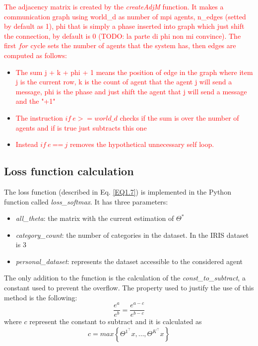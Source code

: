 \documentclass[a4paper,11pt,oneside]{book}
\begin{document}
\textcolor{red}{
The adjacency matrix is created by the \textit{createAdjM} function. It makes a communication graph using world\_d as number of
mpi agents, n\_edges  (setted by default as 1), phi that is simply a phase inserted into
graph which just shift the connection, by default is 0 (TODO: la parte di phi non mi convince). The first $for$
cycle sets the number of agents that the system has, then edges are
computed as follows:}
\begin{itemize}
    \item \textcolor{red}{The sum j + k + phi + 1 means the position of edge in the
    	graph where item j is the current row, k is the count of agent 
    	that the agent j will send a message, phi is the phase and just
    	shift the agent that j will send a message and the "+1" }

    \item \textcolor{red}{The instruction $ if \ e >= world\_d $  checks if the sum is over the number of
    agents and if is true just subtracts this one}

    \item \textcolor{red}{Instead $ if \ e \ $==$ \  j $ removes the hypothetical unnecessary self loop.}
\end{itemize}

\subsection{Loss function calculation}
The loss function (described in Eq. \ref{EQ1.7}) is implemented in the Python function called \textit{loss\_softmax}. It has three parameters:\\
\begin{itemize}
	\item \textit{all\_theta}: the matrix with the current estimation of $\Theta^*$
	\item \textit{category\_count}: the number of categories in the dataset. In the IRIS dataset is $3$
	\item \textit{personal\_dataset}: represents the dataset accessible to the considered agent
\end{itemize}
The only addition to the function is the calculation of the \textit{const\_to\_subtract}, a constant used to prevent the overflow. The property used to justify the use of this method is the following:
\begin{equation}
	\dfrac{e^a}{e^b} = \dfrac{e^{a-c}}{e^{b-c}}
\end{equation}
where $c$ represent the constant to subtract and it is calculated as
\begin{equation}
	c = max \left\{ \Theta^{1^\top}x, \dots,  \Theta^{K^\top}x \right\}
\end{equation}
\end{document}
